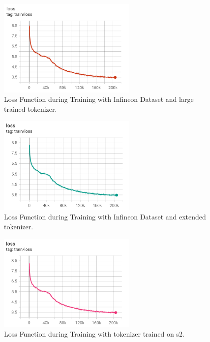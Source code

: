 \begin{figure}[H]
	\centering
	\includegraphics[width=0.6\textwidth]{figures/loss_inf_large.png}
	\caption{Loss Function during Training with Infineon Dataset and large trained tokenizer.}
	\label{fig:loss_large}
\end{figure}

\begin{figure}[H]
	\centering
	\includegraphics[width=0.6\textwidth]{figures/loss_inf_ext.png}
	\caption{Loss Function during Training with Infineon Dataset and extended tokenizer.}
	\label{fig:loss_ext}
\end{figure}

\begin{figure}[H]
	\centering
	\includegraphics[width=0.6\textwidth]{figures/loss_infs2_s2.png}
	\caption{Loss Function during Training with tokenizer trained on s2.}
	\label{fig:loss_s2}
\end{figure}

